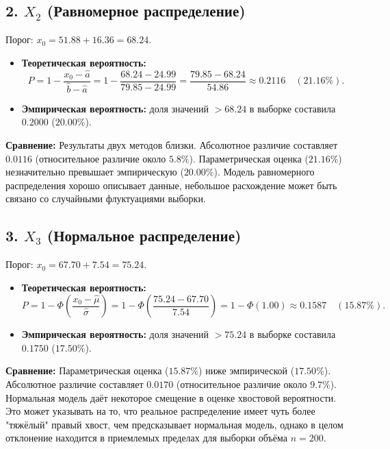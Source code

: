 \subsection{2. $X_2$ (Равномерное распределение)}

Порог: $x_0 = 51.88 + 16.36 = 68.24$.

\begin{itemize}
    \item \textbf{Теоретическая вероятность:} 
    $$
    P = 1 - \frac{x_0 - \hat{a}}{\hat{b} - \hat{a}} = 1 - \frac{68.24 - 24.99}{79.85 - 24.99} = \frac{79.85 - 68.24}{54.86} \approx 0.2116 \quad (21.16\%).
    $$
    \item \textbf{Эмпирическая вероятность:} доля значений $> 68.24$ в выборке составила $0.2000$ ($20.00\%$).
\end{itemize}

\textbf{Сравнение:} Результаты двух методов близки. Абсолютное различие составляет $0.0116$ (относительное различие около $5.8\%$). Параметрическая оценка ($21.16\%$) незначительно превышает эмпирическую ($20.00\%$). Модель равномерного распределения хорошо описывает данные, небольшое расхождение может быть связано со случайными флуктуациями выборки.

\subsection{3. $X_3$ (Нормальное распределение)}

Порог: $x_0 = 67.70 + 7.54 = 75.24$.

\begin{itemize}
    \item \textbf{Теоретическая вероятность:} 
    $$
    P = 1 - \Phi\left(\frac{x_0 - \hat{\mu}}{\hat{\sigma}}\right) = 1 - \Phi\left(\frac{75.24 - 67.70}{7.54}\right) = 1 - \Phi(1.00) \approx 0.1587 \quad (15.87\%).
    $$
    \item \textbf{Эмпирическая вероятность:} доля значений $> 75.24$ в выборке составила $0.1750$ ($17.50\%$).
\end{itemize}

\textbf{Сравнение:} Параметрическая оценка ($15.87\%$) ниже эмпирической ($17.50\%$). Абсолютное различие составляет $0.0170$ (относительное различие около $9.7\%$). Нормальная модель даёт некоторое смещение в оценке хвостовой вероятности. Это может указывать на то, что реальное распределение имеет чуть более "тяжёлый" правый хвост, чем предсказывает нормальная модель, однако в целом отклонение находится в приемлемых пределах для выборки объёма $n = 200$.

